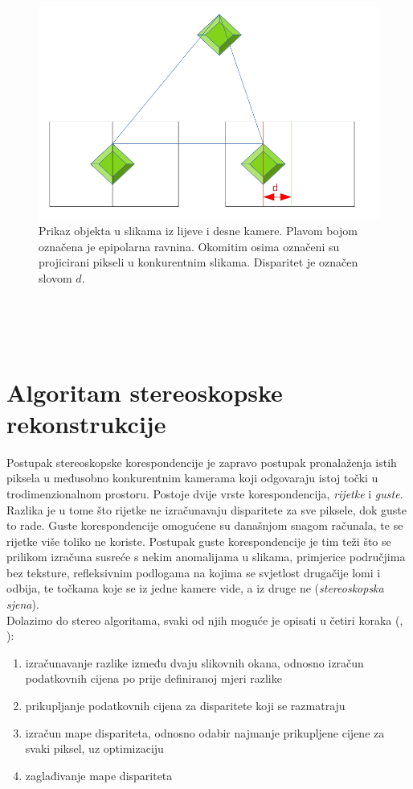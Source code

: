 \documentclass[times, utf8, zavrsni, numeric]{fer}
\begin{document}
\begin{figure}[htb]
\centering
\includegraphics[width = 14.5cm]{img/slika4.png}
\caption{Prikaz objekta u slikama iz lijeve i desne kamere. Plavom bojom označena je epipolarna ravnina. Okomitim osima označeni su projicirani pikseli u konkurentnim slikama. Disparitet je označen slovom $d$.}
\label{fig:Disparitet i epipolar}
\end{figure}\\
\\\\
\section{Algoritam stereoskopske rekonstrukcije}
Postupak stereoskopske korespondencije je zapravo postupak pronalaženja istih piksela u međusobno konkurentnim kamerama koji odgovaraju istoj točki u trodimenzionalnom prostoru. Postoje dvije vrste korespondencija, \textit{rijetke} i \textit{guste}. Razlika je u tome što rijetke ne izračunavaju disparitete za sve piksele, dok guste to rade. Guste korespondencije omogućene su današnjom snagom računala, te se rijetke više toliko ne koriste. Postupak guste korespondencije je tim teži što se prilikom izračuna susreće s nekim anomalijama u slikama, primjerice područjima bez teksture, refleksivnim podlogama na kojima se svjetlost drugačije lomi i odbija, te točkama koje se iz jedne kamere vide, a iz druge ne (\textit{stereoskopska sjena}).\\
Dolazimo do stereo algoritama, svaki od njih moguće je opisati u četiri koraka (\citep{scharszelinski}, \citep{kovac2015stereo}):
\begin{enumerate}
\item izračunavanje razlike između dvaju slikovnih okana, odnosno izračun podatkovnih cijena po prije definiranoj mjeri razlike
\item prikupljanje podatkovnih cijena za disparitete koji se razmatraju
\item izračun mape dispariteta, odnosno odabir najmanje prikupljene cijene za svaki piksel, uz optimizaciju
\item zaglađivanje mape dispariteta 
\end{enumerate}
\end{document}
